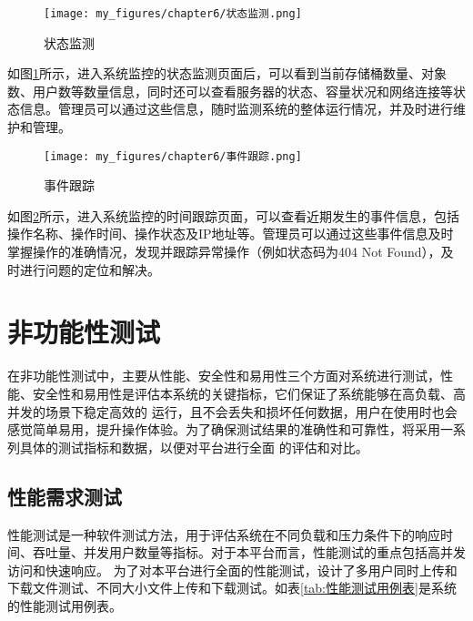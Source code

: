 \begin{figure}[htb]
    \centering
    \texttt{[image: my\_figures/chapter6/状态监测.png]}
    \caption{状态监测}
    \label{fig:状态监测}
\end{figure}

如图\ref{fig:状态监测}所示，进入系统监控的状态监测页面后，可以看到当前存储桶数量、对象数、用户数等数量信息，同时还可以查看服务器的状态、容量状况和网络连接等状态信息。管理员可以通过这些信息，随时监测系统的整体运行情况，并及时进行维护和管理。

\begin{figure}[htb]
    \centering
    \texttt{[image: my\_figures/chapter6/事件跟踪.png]}
    \caption{事件跟踪}
    \label{fig:事件跟踪}
\end{figure}

如图\ref{fig:事件跟踪}所示，进入系统监控的时间跟踪页面，可以查看近期发生的事件信息，包括操作名称、操作时间、操作状态及IP地址等。管理员可以通过这些事件信息及时掌握操作的准确情况，发现并跟踪异常操作（例如状态码为404 Not Found），及时进行问题的定位和解决。


\section{非功能性测试}

在非功能性测试中，主要从性能、安全性和易用性三个方面对系统进行测试，性能、安全性和易用性是评估本系统的关键指标，它们保证了系统能够在高负载、高并发的场景下稳定高效的
运行，且不会丢失和损坏任何数据，用户在使用时也会感觉简单易用，提升操作体验。为了确保测试结果的准确性和可靠性，将采用一系列具体的测试指标和数据，以便对平台进行全面
的评估和对比。



\subsection{性能需求测试}

性能测试是一种软件测试方法，用于评估系统在不同负载和压力条件下的响应时间、吞吐量、并发用户数量等指标。对于本平台而言，性能测试的重点包括高并发访问和快速响应。
为了对本平台进行全面的性能测试，设计了多用户同时上传和下载文件测试、不同大小文件上传和下载测试。如表\ref{tab:性能测试用例表}是系统的性能测试用例表。

